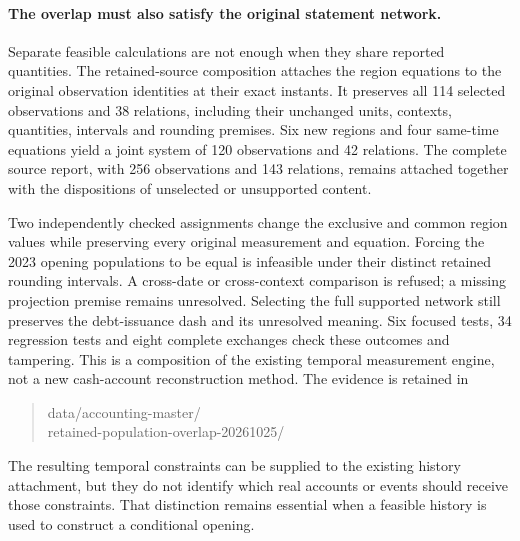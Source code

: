 \paragraph{The overlap must also satisfy the original statement network.}
Separate feasible calculations are not enough when they share reported
quantities. The retained-source composition attaches the region equations to
the original observation identities at their exact instants. It preserves all
114 selected observations and 38 relations, including their unchanged units,
contexts, quantities, intervals and rounding premises. Six new regions and four
same-time equations yield a joint system of 120 observations and 42 relations.
The complete source report, with 256 observations and 143 relations, remains
attached together with the dispositions of unselected or unsupported content.

Two independently checked assignments change the exclusive and common region
values while preserving every original measurement and equation. Forcing the
2023 opening populations to be equal is infeasible under their distinct
retained rounding intervals. A cross-date or cross-context comparison is
refused; a missing projection premise remains unresolved. Selecting the full
supported network still preserves the debt-issuance dash and its unresolved
meaning. Six focused tests, 34 regression tests and eight complete exchanges
check these outcomes and tampering. This is a composition of the existing
temporal measurement engine, not a new cash-account reconstruction method.
The evidence is retained in
\begin{quote}\small\ttfamily
data/accounting-master/\\
retained-population-overlap-20261025/
\end{quote}
The resulting temporal constraints can be supplied to the existing history
attachment, but they do not identify which real accounts or events should
receive those constraints. That distinction remains essential when a feasible
history is used to construct a conditional opening.
